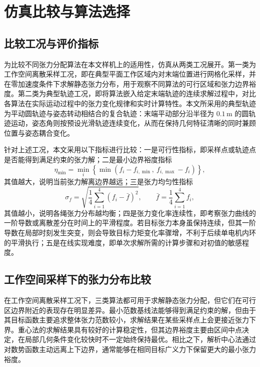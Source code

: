 \section{仿真比较与算法选择}

\subsection{比较工况与评价指标}

为比较不同张力分配算法在本文样机上的适用性，仿真从两类工况展开。第一类为工作空间离散采样工况，即在典型平面工作区域内对末端位置进行网格化采样，并在零加速度条件下求解静态张力分布，用于观察不同算法的可行区域和张力边界裕度。第二类为典型轨迹工况，即将算法嵌入给定末端轨迹的连续求解过程中，对比各算法在实际运动过程中的张力变化规律和实时计算特性。本文所采用的典型轨迹为平动圆轨迹与姿态转动相结合的复合轨迹：末端平动部分沿半径为 $0.1\,\mathrm{m}$ 的圆轨迹运动，姿态角则按预设光滑轨迹连续变化，从而在保持几何特征清晰的同时兼顾位置与姿态耦合变化。

针对上述工况，本文采用以下指标进行比较：一是可行性指标，即采样点或轨迹点是否能得到满足约束的张力解；二是最小边界裕度指标
\begin{equation}
  \eta_{\min}=\min_i\left\{\min\left(f_i-f_{i,\min},\ f_{i,\max}-f_i\right)\right\}, \label{eq:ch5-margin}
\end{equation}
其值越大，说明当前张力解离边界越远；三是张力均匀性指标
\begin{equation}
  \sigma_f=\sqrt{\frac{1}{4}\sum_{i=1}^{4}\left(f_i-\bar f\right)^2},\qquad \bar f=\frac{1}{4}\sum_{i=1}^{4}f_i, \label{eq:ch5-sigmaf}
\end{equation}
其值越小，说明各绳张力分布越均衡；四是张力变化率连续性，即考察张力曲线的一阶导数或离散差分在时间上的平滑程度。若目标张力本身虽保持连续，但其一阶导数在局部时刻发生突变，则会导致目标力矩变化率骤增，不利于后续单电机内环的平滑执行；五是在线实现难度，即单次求解所需的计算步骤和对初值的敏感程度。

\subsection{工作空间采样下的张力分布比较}

在工作空间离散采样工况下，三类算法都可用于求解静态张力分配，但它们在可行区边界附近的表现存在明显差异。最小范数基线法能够得到满足约束的解，但由于其目标函数主要追求整体张力范数较小，求解结果在某些采样点上会更接近张力下界。重心法的求解结果具有较好的计算稳定性，但其边界裕度主要由区间中点决定，在局部几何条件变化较快时不一定始终保持最优。相比之下，解析中心法通过对数势函数主动远离上下边界，通常能够在相同目标广义力下保留更大的最小张力裕度。

